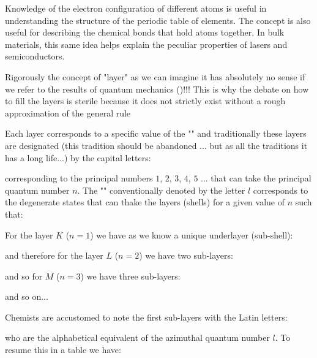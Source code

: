 	Knowledge of the electron configuration of different atoms is useful in understanding the structure of the periodic table of elements. The concept is also useful for describing the chemical bonds that hold atoms together. In bulk materials, this same idea helps explain the peculiar properties of lasers and semiconductors.
	
	\begin{tcolorbox}[title=Remark,colframe=black,arc=10pt]
		Rigorously the concept of "layer" as we can imagine it has absolutely no sense if we refer to the results of quantum mechanics ()!!! This is why the debate on how to fill the layers is sterile because it does not strictly exist without a rough approximation of the general rule
	\end{tcolorbox}
	Each layer corresponds to a specific value of the "" and traditionally these layers are designated (this tradition should be abandoned ... but as all the traditions it has a long life...) by the capital letters:
	
	corresponding to the principal numbers $1$, $2$, $3$, $4$, $5$ ... that can take the principal quantum number $n$.
	The "" conventionally denoted by the letter $l$ corresponds to the degenerate states that can thake the layers (shells) for a given value of $n$ such that:

	For the layer $K$ ($n=1$) we have as we know a unique underlayer (sub-shell):
	
	and therefore for the layer $L$ ($n=2$) we have two sub-layers:
	
	and so for $M$ ($n=3$) we have three sub-layers:
	
	and so on...

	Chemists are accustomed to note the first sub-layers with the Latin letters:
	
	who are the alphabetical equivalent of the azimuthal quantum number $l$. To resume this in a table we have:
	

